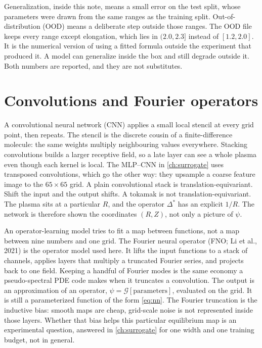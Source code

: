\documentclass[11pt,a4paper,oneside,openany]{book}
\numberwithin{equation}{chapter}
\newcommand{\Dstar}{\Delta^{*}}
\theoremstyle{definition}
\begin{document}
Generalization, inside this note, means a small error on the test split, whose parameters were drawn from the same ranges as the training split. Out-of-distribution (OOD) means a deliberate step outside those ranges. The OOD file keeps every range except elongation, which lies in \((2.0,2.3]\) instead of \([1.2,2.0]\). It is the numerical version of using a fitted formula outside the experiment that produced it. A model can generalize inside the box and still degrade outside it. Both numbers are reported, and they are not substitutes.

\section{Convolutions and Fourier operators}

A convolutional neural network (CNN) applies a small local stencil at every grid point, then repeats. The stencil is the discrete cousin of a finite-difference molecule: the same weights multiply neighbouring values everywhere. Stacking convolutions builds a larger receptive field, so a late layer can see a whole plasma even though each kernel is local. The MLP--CNN in \cref{ch:surrogate} uses transposed convolutions, which go the other way: they upsample a coarse feature image to the \(65\times 65\) grid. A plain convolutional stack is translation-equivariant. Shift the input and the output shifts. A tokamak is not translation-equivariant. The plasma sits at a particular \(R\), and the operator \(\Dstar\) has an explicit \(1/R\). The network is therefore shown the coordinates \((R,Z)\), not only a picture of \(\psi\).

An operator-learning model tries to fit a map between functions, not a map between nine numbers and one grid. The Fourier neural operator (FNO; Li et al., 2021) is the operator model used here. It lifts the input functions to a stack of channels, applies layers that multiply a truncated Fourier series, and projects back to one field. Keeping a handful of Fourier modes is the same economy a pseudo-spectral PDE code makes when it truncates a convolution. The output is an approximation of an operator, \(\psi=\mathcal{G}[\text{parameters}]\), evaluated on the grid. It is still a parameterized function of the form \eqref{eq:nn}. The Fourier truncation is the inductive bias: smooth maps are cheap, grid-scale noise is not represented inside those layers. Whether that bias helps this particular equilibrium map is an experimental question, answered in \cref{ch:surrogate} for one width and one training budget, not in general.
\end{document}
